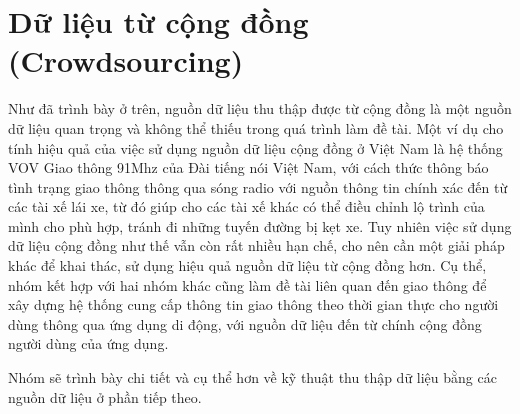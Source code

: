 \section{Dữ liệu từ cộng đồng (Crowdsourcing)}
Như đã trình bày ở trên, nguồn dữ liệu thu thập được từ cộng đồng là một nguồn dữ liệu quan trọng và không thể thiếu trong quá trình làm đề tài. Một ví dụ cho tính hiệu quả của việc sử dụng nguồn dữ liệu cộng đồng ở Việt Nam là hệ thống VOV Giao thông 91Mhz của Đài tiếng nói Việt Nam, với cách thức thông báo tình trạng giao thông thông qua sóng radio với nguồn thông tin chính xác đến từ các tài xế lái xe, từ đó giúp cho các tài xế khác có thể điều chỉnh lộ trình của mình cho phù hợp, tránh đi những tuyến đường bị kẹt xe. Tuy nhiên việc sử dụng dữ liệu cộng đồng như thế vẫn còn rất nhiều hạn chế, cho nên cần một giải pháp khác để khai thác, sử dụng hiệu quả nguồn dữ liệu từ cộng đồng hơn. Cụ thể, nhóm kết hợp với hai nhóm khác cũng làm đề tài liên quan đến giao thông để xây dựng hệ thống cung cấp thông tin giao thông theo thời gian thực cho người dùng thông qua ứng dụng di động, với nguồn dữ liệu đến từ chính cộng đồng người dùng của ứng dụng.

Nhóm sẽ trình bày chi tiết và cụ thể hơn về kỹ thuật thu thập dữ liệu bằng các nguồn dữ liệu ở phần tiếp theo.
